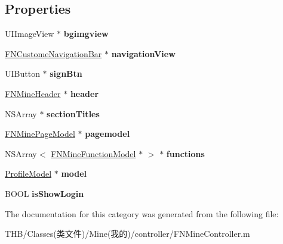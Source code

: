 \subsection*{Properties}
\begin{DoxyCompactItemize}
\item 
\mbox{\label{category_f_n_mine_controller_07_08_a3f02298081b3a197b6c30c17f08b3581}} 
U\+I\+Image\+View $\ast$ {\bfseries bgimgview}
\item 
\mbox{\label{category_f_n_mine_controller_07_08_a33d546a826a9eb8861dc8885f7bf7159}} 
\mbox{\hyperlink{interface_f_n_custome_navigation_bar}{F\+N\+Custome\+Navigation\+Bar}} $\ast$ {\bfseries navigation\+View}
\item 
\mbox{\label{category_f_n_mine_controller_07_08_a8a64f4709f8b55013881f2ebf67e4dd9}} 
U\+I\+Button $\ast$ {\bfseries sign\+Btn}
\item 
\mbox{\label{category_f_n_mine_controller_07_08_a240abf47c06e87cd4f4636fcf1c391d6}} 
\mbox{\hyperlink{interface_f_n_mine_header}{F\+N\+Mine\+Header}} $\ast$ {\bfseries header}
\item 
\mbox{\label{category_f_n_mine_controller_07_08_afabe3f7d44cf07d7c5dcd847d3432ad5}} 
N\+S\+Array $\ast$ {\bfseries section\+Titles}
\item 
\mbox{\label{category_f_n_mine_controller_07_08_a5592f4f7ef8b33db303dc9e8e9bc00a5}} 
\mbox{\hyperlink{interface_f_n_mine_page_model}{F\+N\+Mine\+Page\+Model}} $\ast$ {\bfseries pagemodel}
\item 
\mbox{\label{category_f_n_mine_controller_07_08_a572bd527784fc27eee7f91fb30151de6}} 
N\+S\+Array$<$ \mbox{\hyperlink{interface_f_n_mine_function_model}{F\+N\+Mine\+Function\+Model}} $\ast$ $>$ $\ast$ {\bfseries functions}
\item 
\mbox{\label{category_f_n_mine_controller_07_08_a6b9f9fa58330532e7b35dbf5e044f55a}} 
\mbox{\hyperlink{interface_profile_model}{Profile\+Model}} $\ast$ {\bfseries model}
\item 
\mbox{\label{category_f_n_mine_controller_07_08_a7d67001dd11afc0932e84917f03f6fc4}} 
B\+O\+OL {\bfseries is\+Show\+Login}
\end{DoxyCompactItemize}


The documentation for this category was generated from the following file\+:\begin{DoxyCompactItemize}
\item 
T\+H\+B/\+Classes(类文件)/\+Mine(我的)/controller/F\+N\+Mine\+Controller.\+m\end{DoxyCompactItemize}
